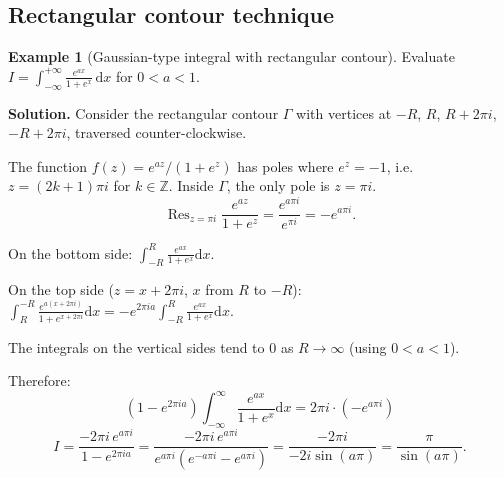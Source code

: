 \documentclass[12pt,a4paper,openany]{book}
\theoremstyle{definition}
\newtheorem{example}[definition]{Example}
\theoremstyle{plain}
\theoremstyle{remark}
\newcommand{\Z}{\mathbb{Z}}
\DeclareMathOperator{\re}{Re}
\DeclareMathOperator{\im}{Im}
\DeclareMathOperator{\Res}{Res}
\newcommand{\dd}{\mathrm{d}}
\begin{document}
\subsection{Rectangular contour technique}
\label{ssec:rectangular}

\begin{example}[Gaussian-type integral with rectangular contour]\label{ex:rect-contour}
Evaluate $\displaystyle I=\int_{-\infty}^{+\infty}
\frac{e^{ax}}{1+e^x}\,\dd x$ for $0<a<1$.

\medskip\noindent\textbf{Solution.}
Consider the rectangular contour $\Gamma$ with vertices at
$-R$, $R$, $R+2\pi i$, $-R+2\pi i$, traversed counter-clockwise.

\begin{center}
\end{center}

The function $f(z)=e^{az}/(1+e^z)$ has poles where $e^z=-1$, i.e.\
$z=(2k+1)\pi i$ for $k\in\Z$.  Inside $\Gamma$, the only pole is
$z=\pi i$.
\[
  \Res_{z=\pi i}\frac{e^{az}}{1+e^z}
  =\frac{e^{a\pi i}}{e^{\pi i}}=-e^{a\pi i}.
\]

On the bottom side: $\int_{-R}^{R}\frac{e^{ax}}{1+e^x}\dd x$.

On the top side ($z=x+2\pi i$, $x$ from $R$ to $-R$):
$\int_{R}^{-R}\frac{e^{a(x+2\pi i)}}{1+e^{x+2\pi i}}\dd x
=-e^{2\pi ia}\int_{-R}^{R}\frac{e^{ax}}{1+e^x}\dd x$.

The integrals on the vertical sides tend to $0$ as $R\to\infty$
(using $0<a<1$).

Therefore:
\[
  (1-e^{2\pi ia})\int_{-\infty}^{\infty}\frac{e^{ax}}{1+e^x}\dd x
  =2\pi i\cdot(-e^{a\pi i})
\]
\[
  I=\frac{-2\pi i\,e^{a\pi i}}{1-e^{2\pi ia}}
  =\frac{-2\pi i\,e^{a\pi i}}{e^{a\pi i}(e^{-a\pi i}-e^{a\pi i})}
  =\frac{-2\pi i}{-2i\sin(a\pi)}
  =\frac{\pi}{\sin(a\pi)}.
\]
\end{example}
\end{document}
